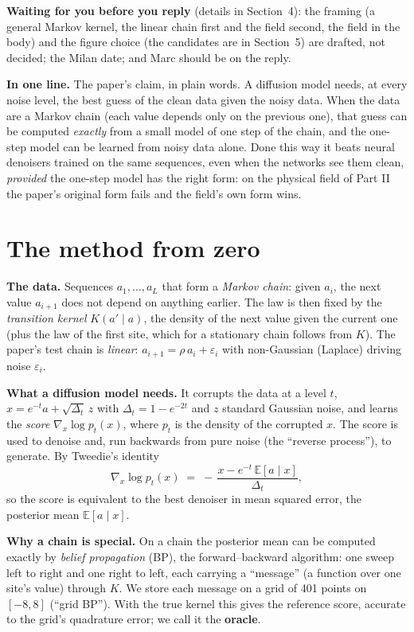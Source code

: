\documentclass[11pt,a4paper]{article}
\newcommand{\key}[1]{\par\smallskip\noindent\colorbox{soft}{\parbox{\dimexpr\linewidth-2\fboxsep}{\small\textbf{In one line.} #1}}\par\smallskip}
\begin{document}
\textbf{Waiting for you before you reply} (details in Section~4): the framing (a general Markov kernel, the linear chain first and the
field second, the field in the body) and the figure choice (the candidates are in Section~5) are drafted, not decided; the Milan date; and Marc should be on the reply.

\bigskip
\key{The paper's claim, in plain words. A diffusion model needs, at every noise level, the best guess of the clean data given the
noisy data. When the data are a Markov chain (each value depends only on the previous one), that guess can be computed
\emph{exactly} from a small model of one step of the chain, and the one-step model can be learned from noisy data alone. Done this
way it beats neural denoisers trained on the same sequences, even when the networks see them clean, \emph{provided} the one-step
model has the right form: on the physical field of Part II the paper's original form fails and the field's own form wins.}

\section{The method from zero}

\textbf{The data.} Sequences $a_1,\dots,a_L$ that form a \emph{Markov chain}: given $a_i$, the next value $a_{i+1}$ does not depend
on anything earlier. The law is then fixed by the \emph{transition kernel} $K(a'\mid a)$, the density of the next value given the
current one (plus the law of the first site, which for a stationary chain follows from $K$). The paper's test chain is
\emph{linear}: $a_{i+1}=\rho\,a_i+\varepsilon_i$ with non-Gaussian (Laplace) driving noise $\varepsilon_i$.

\textbf{What a diffusion model needs.} It corrupts the data at a level $t$, $x=e^{-t}a+\sqrt{\Delta_t}\,z$ with $\Delta_t=1-e^{-2t}$ and
$z$ standard Gaussian noise, and learns the \emph{score} $\nabla_x\log p_t(x)$, where $p_t$ is the density of the corrupted $x$. The
score is used to denoise and, run backwards from pure noise (the ``reverse process''), to generate. By Tweedie's identity
\[
\nabla_x\log p_t(x) \;=\; -\,\frac{x-e^{-t}\,\mathbb E[a\mid x]}{\Delta_t},
\]
so the score is equivalent to the best denoiser in mean squared error, the posterior mean $\mathbb E[a\mid x]$.

\textbf{Why a chain is special.} On a chain the posterior mean can be computed exactly by \emph{belief propagation} (BP), the
forward--backward algorithm: one sweep left to right and one right to left, each carrying a ``message'' (a function over one
site's value) through $K$. We store each message on a grid of 401 points on $[-8,8]$ (``grid BP''). With the true kernel this
gives the reference score, accurate to the grid's quadrature error; we call it the \textbf{oracle}.
\end{document}
